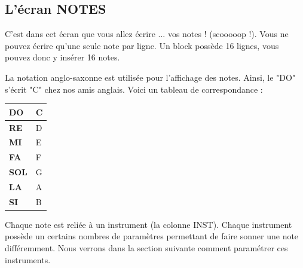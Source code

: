 \documentclass[12pt,a4paper]{article}
\begin{document}
        
    
    \subsection{L'écran NOTES}
    
    C'est dans cet écran que vous allez écrire ... vos notes ! (scooooop !).
    Vous ne pouvez écrire qu'une seule note par ligne.
    Un block possède 16 lignes, vous pouvez donc y insérer 16 notes.
    \medskip
    
    La notation anglo-saxonne est utilisée pour l'affichage des notes.
    Ainsi, le "DO" s'écrit "C" chez nos amis anglais.
    Voici un tableau de correspondance :
    \medskip
    
    \begin{center}
        \tablelasttail{\hline}
        \begin{supertabular}{|l|l|}
        \hline
            {\bf DO} & C \\
            \hline
            {\bf RE} & D \\
            \hline
            {\bf MI} & E \\
            \hline
            {\bf FA} & F \\
            \hline
            {\bf SOL} & G \\
            \hline
            {\bf LA} & A \\
            \hline
            {\bf SI} & B \\
        \hline
        \end{supertabular}
    \end{center}

    
    Chaque note est reliée à un instrument (la colonne INST).
    Chaque instrument possède un certains nombres de paramètres permettant de faire sonner une note différemment.
    Nous verrons dans la section suivante comment paramétrer ces instruments.
    
    
\end{document}
